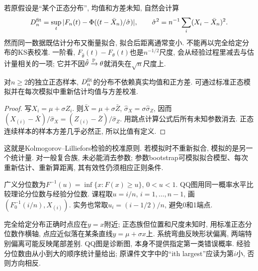 若原假设是``某个正态分布'', 均值和方差未知, 自然会计算
\[
 D_n^{\rm fit}=\sup_t|F_n(t)-\Phi((t-\bar X_n)/\hat\sigma)|,
 \qquad\hat\sigma^2=n^{-1}\sum_i(X_i-\bar X_n)^2.
\]
然而同一数据既估计分布又衡量拟合, 拟合后距离通常变小. 不能再以完全给定分布的KS表校准. 一阶看, $F_{\hat\theta}(t)-F_\theta(t)$也是$n^{-1/2}$尺度, 会从经验过程里减去与估计量相关的一项; 它并不因$\hat\theta\xrightarrow{\mathbb P}\theta$就消失在$\sqrt n$尺度上.
\begin{proposition}[正态族的Lilliefors枢轴性]
对$n\geq2$的独立正态样本, $D_n^{\rm fit}$的分布不依赖真实均值和正方差. 可通过标准正态模拟并在每次模拟中重新估计均值与方差校准.
\end{proposition}
\begin{proof}
写$X_i=\mu+\sigma Z_i$. 则$\bar X=\mu+\sigma\bar Z$, $\hat\sigma_X=\sigma\hat\sigma_Z$, 因而$(X_{(i)}-\bar X)/\hat\sigma_X=(Z_{(i)}-\bar Z)/\hat\sigma_Z$. 用跳点计算公式后所有未知参数消去. 正态连续样本的样本方差几乎必然正, 所以比值有定义.
\end{proof}
这就是Kolmogorov--Lilliefors检验的校准原则. 若模拟时不重新拟合, 模拟的是另一个统计量. 对一般复合族, 未必能消去参数; 参数bootstrap可模拟拟合模型、每次重新估计、重新算距离, 其有效性仍须相应正则条件.

\begin{definition}[分位数图]
广义分位数为$F^{-1}(u)=\inf\{x:F(x)\geq u\}$, $0<u<1$. QQ图用同一概率水平比较理论分位数与经验分位数. 课程取$u=i/n$, $i=1,\ldots,n-1$, 画$(F_0^{-1}(i/n),X_{(i)})$. 实务也常取$u_i=(i-1/2)/n$, 避免0和1端点.
\end{definition}
完全给定分布正确时点应在$y=x$附近; 正态族但位置和尺度未知时, 用标准正态分位数作横轴, 点应近似落在某条直线$y=\mu+\sigma x$上. 系统弯曲反映形状偏离, 两端特别偏离可能反映尾部差别. QQ图是诊断图, 本身不提供指定第一类错误概率. 经验分位数由从小到大的顺序统计量给出; 原课件文字中的``ith largest''应读为第$i$小, 否则方向相反.

